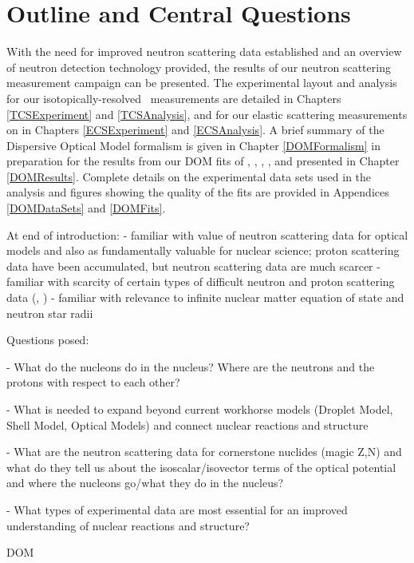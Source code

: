 \section{Outline and Central Questions}
With the need for improved neutron scattering data established and an overview of neutron
detection technology provided, the results of our neutron scattering measurement campaign can be
presented. The experimental layout and analysis for our isotopically-resolved \tot\ measurements are 
detailed
in Chapters \ref{TCSExperiment} and \ref{TCSAnalysis}, and for our elastic scattering measurements 
on \snTwelveFour in Chapters \ref{ECSExperiment} and \ref{ECSAnalysis}. A brief summary of the 
Dispersive Optical Model formalism is
given in Chapter \ref{DOMFormalism} in preparation for the results from our DOM fits of \oSixEight, \caAughtEight, 
\niEightFour, \snTwelveFour, and \pbEight presented in Chapter \ref{DOMResults}. Complete
details on the experimental data sets used in the analysis and figures showing the quality of the
fits are provided in Appendices \ref{DOMDataSets} and \ref{DOMFits}. 

At end of introduction:
- familiar with value of neutron scattering data for optical models and also as
fundamentally valuable for nuclear science; proton scattering data have been
accumulated, but neutron scattering data are much scarcer
- familiar with scarcity of certain types of difficult neutron and proton
scattering data (\tot, \rxnE)
- familiar with relevance to infinite nuclear matter equation of state and
neutron star radii

Questions posed:

- What do the nucleons do in the nucleus? Where are the neutrons and the protons
with respect to each other?

- What is needed to expand beyond current workhorse models (Droplet Model,
Shell Model, Optical Models) and connect nuclear reactions and structure

- What are the neutron scattering data for cornerstone nuclides (magic Z,N) and
what do they tell us about the isoscalar/isovector terms of the optical
potential and where the nucleons go/what they do in the nucleus?

- What types of experimental data are most essential for an improved understanding of nuclear
reactions and structure?

\gls{DOM}


%

